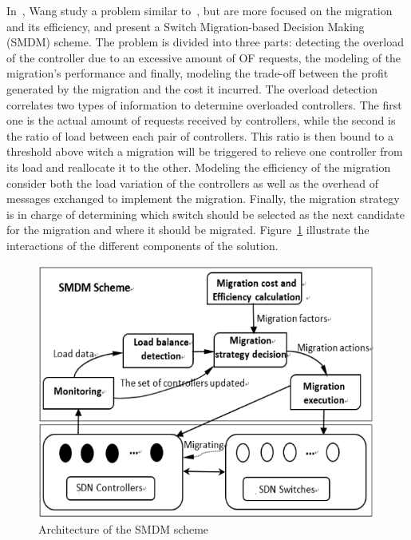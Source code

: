 In~\cite{Wang2017d}, Wang \etal study a problem similar to~\cite{Ye2017a}, but are more focused on the migration and its efficiency, and present a Switch Migration-based Decision Making (SMDM) scheme. 
The problem is divided into three parts: detecting the overload of the controller due to an excessive amount of OF requests, the modeling of the migration's performance and finally, modeling the trade-off between the profit generated by the migration and the cost it incurred.
The overload detection correlates two types of information to determine overloaded controllers.
The first one is the actual amount of requests received by controllers, while the second is the ratio of load between each pair of controllers.
This ratio is then bound to a threshold above witch a migration will be triggered to relieve one controller from its load and reallocate it to the other.
Modeling the efficiency of the migration consider both the load variation of the controllers as well as the overhead of messages exchanged to implement the migration.  
Finally, the migration strategy is in charge of determining which switch should be selected as the next candidate for the migration and where it should be migrated.
Figure~\ref{fig:smdm-wang2017d} illustrate the interactions of the different components of the solution.

\begin{figure}[ht]
    \centering
    \includegraphics[scale=0.65]{figures/wang2017d.png}
    \caption{Architecture of the SMDM scheme~\cite{Wang2017d}}
    \label{fig:smdm-wang2017d}
\end{figure}

